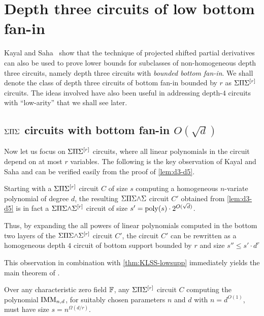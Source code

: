 \chapter{Depth three circuits of low bottom fan-in}

Kayal and Saha~\cite{KayalSaha14} show that the technique of projected shifted partial derivatives can also be used to prove lower bounds for subclasses of non-homogeneous depth three circuits, namely depth three circuits with \emph{bounded bottom fan-in}.
We shall denote the class of depth three circuits of bottom fan-in bounded by $r$ as $\Sigma\Pi\Sigma^{[r]}$ circuits.
The ideas involved have also been useful in addressing depth-$4$ circuits with ``low-arity'' \cite{KumarSaraf15,KayalSaha15} that we shall see later. 

\section{$\Sigma\Pi\Sigma$ circuits with bottom fan-in $O(\sqrt{d})$}

Now let us focus on $\Sigma\Pi\Sigma^{[r]}$ circuits, where all linear polynomials in the circuit depend on at most $r$ variables.
The following is the key observation of Kayal and Saha \cite{KayalSaha14} and can be verified easily from the proof of \autoref{lem:d3-d5}.

\begin{observation}\label{obs:d3-d5-fanin}
  Starting with a $\Sigma\Pi\Sigma^{[r]}$ circuit $C$ of size $s$ computing a homogeneous $n$-variate polynomial of degree $d$, the resulting $\Sigma\Pi\Sigma\mathord{\wedge}\Sigma$ circuit $C'$ obtained from \autoref{lem:d3-d5} is in fact a $\Sigma\Pi\Sigma\mathord{\wedge}\Sigma^{[r]}$ circuit of size $s' = \operatorname{poly}(s) \cdot 2^{O(\sqrt{d})}$.

  Thus, by expanding the all powers of linear polynomials computed in the bottom two layers of the $\Sigma\Pi\Sigma\mathord{\wedge}\Sigma^{[r]}$ circuit $C'$, the circuit $C'$ can be rewritten as a homogeneous depth $4$ circuit of bottom support bounded by $r$ and size $s'' \leq s' \cdot d^r$
\end{observation}

This observation in combination with \autoref{thm:KLSS-lowsupp} immediately yields the main theorem of \cite{KayalSaha14}.

\begin{theorem}\label{thm:kaysaha-main}
  Over any characteristic zero field $\mathbb{F}$, any $\Sigma\Pi\Sigma^{[r]}$ circuit
  $C$ computing the polynomial $\operatorname{\mathrm{IMM}}_{n,d}$, for suitably chosen
  parameters $n$ and $d$ with $n = d^{O(1)}$, must have size $s =
  n^{\Omega(d/r)}$. 
\end{theorem}


